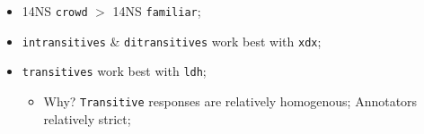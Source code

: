 \documentclass[handout,xcolor={dvipsnames}]{beamer}
\newcommand{\param}[1]{\texttt{#1}}
\begin{document}
\begin{frame}
\pause
\begin{itemize}
\item 14NS \param{crowd} $>$ 14NS \param{familiar};
\pause
\item \param{intransitives} \& \param{ditransitives} work best with \param{xdx};
\pause
\item \param{transitives} work best with \param{ldh};
\begin{itemize}
\pause
\item Why? \param{Transitive} responses are relatively homogenous; Annotators relatively strict;
\end{itemize}
\end{itemize}

\end{frame}

\end{document}
